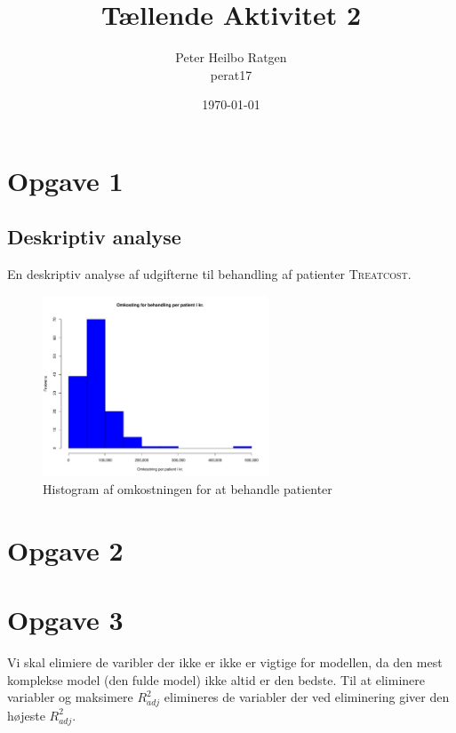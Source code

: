 \documentclass{article}
\title{Tællende Aktivitet 2}
\author{Peter Heilbo Ratgen \\ perat17}
\date{\today}
\begin{document}
\maketitle

\section{Opgave 1}
\subsection{Deskriptiv analyse}
En deskriptiv analyse af udgifterne til behandling af patienter 
\textsc{Treatcost}. 
\begin{figure}[h]
  \centering
  \includegraphics[width=0.6\textwidth]{./plots/treatcost.pdf}
  \caption{Histogram af omkostningen for at behandle patienter}
\end{figure}







\section*{Opgave 2}


\section*{Opgave 3}

Vi skal elimiere de varibler der ikke er ikke er vigtige for modellen, da den
mest komplekse model (den fulde model) ikke altid er den bedste. Til at
eliminere variabler og maksimere $ R^2_{adj} $ elimineres de variabler der ved
eliminering giver den højeste $ R^2_{adj} $. 
\end{document}
